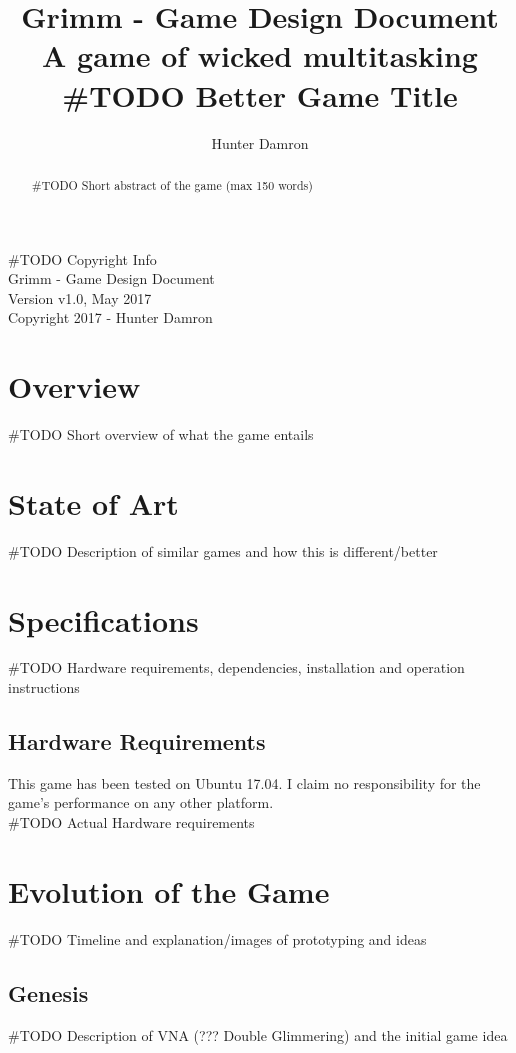 \documentclass{scrreprt}
\title{
	Grimm - Game Design Document \\
    \large A game of wicked multitasking
    \\\#TODO Better Game Title
}
\author{Hunter Damron}
\begin{document}
	\maketitle
	
	\null\vfill
	\noindent
	\#TODO Copyright Info \\
	Grimm - Game Design Document \\ 
	Version v1.0, May 2017 \\
	Copyright 2017 - Hunter Damron \\
	\newpage
	
	\begin{abstract}
		\#TODO Short abstract of the game (max 150 words)
	\end{abstract}
	\newpage

	\tableofcontents
	\newpage
	
	\chapter{Overview}
		\#TODO Short overview of what the game entails
	
	\chapter{State of Art}
		\#TODO Description of similar games and how this is different/better
	
	\chapter{Specifications}
		\#TODO Hardware requirements, dependencies, installation and operation instructions
	
		\section{Hardware Requirements}
			This game has been tested on Ubuntu 17.04. I claim no responsibility for the game's performance on any other platform.
			\\\#TODO Actual Hardware requirements
	
	\chapter{Evolution of the Game}
		\#TODO Timeline and explanation/images of prototyping and ideas
		
		\section{Genesis}
			\#TODO Description of VNA (??? Double Glimmering) and the initial game idea
			
\end{document}
